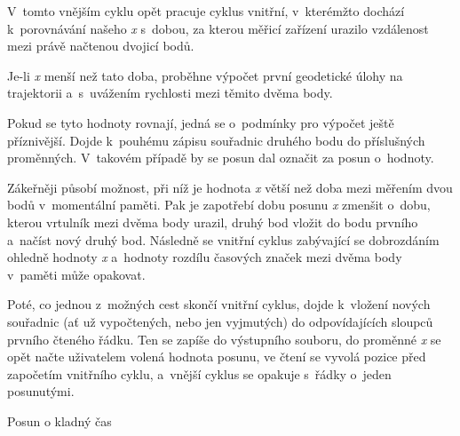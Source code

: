 V~tomto vnějším cyklu opět pracuje cyklus vnitřní, v~kterémžto dochází k~porov\-ná\-vá\-ní našeho
\textit{x} s~dobou, za kterou měřicí zařízení urazilo vzdálenost mezi právě načtenou dvojicí bodů. 

Je-li \textit{x} menší než tato doba, proběhne výpočet první geodetické úlohy na trajektorii
a~s~uvážením rychlosti mezi těmito dvěma body. 

Pokud se tyto hodnoty rovnají, jedná se o~podmínky pro výpočet ještě příznivější. Dojde k~pouhému
zápisu souřadnic druhého bodu do příslušných proměnných. V~ta\-ko\-vém
případě by se posun dal označit za posun o~hodnoty. 

Zákeřněji působí možnost, při níž je hodnota \textit{x} větší než doba mezi měřením dvou
bodů v~momentální paměti. Pak je zapotřebí dobu posunu \textit{x} zmenšit o~dobu, kterou
vrtulník mezi dvěma body urazil, druhý bod vložit do bodu prvního a~načíst nový druhý bod. Následně
se vnitřní cyklus zabývající se dobrozdáním ohledně hodnoty \textit{x} a~hodnoty
rozdílu časových značek mezi dvěma body v~paměti může opakovat. 

Poté, co jednou z~možných cest skončí vnitřní cyklus, dojde k~vložení nových souřadnic
(ať už vypočtených, nebo jen vyjmutých) do odpovídajících sloupců první\-ho čteného řádku.
Ten se zapíše do výstupního souboru, do proměnné \textit{x} se opět načte uživatelem volená
hodnota posunu, ve čtení se vyvolá pozice před započetím vnitřního cyklu, a~vnější cyklus se
opakuje s~řádky o~jeden posunutými. 

\begin{algorithm}
    \caption{Posun o kladný čas}
    \label{fig:pseudokladnycas}
    \begin{algorithmic}[1]
\end{algorithmic}
\end{algorithm}

\begin{algorithm}                     
\begin{algorithmic} [1]
    \ENDWHILE
    \ENDWHILE
    \end{algorithmic}
\end{algorithm}

